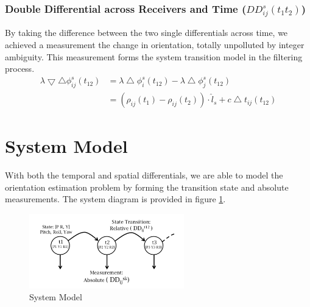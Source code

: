 \documentclass[journal,onecolumn]{IEEEtran}
\begin{document}
\subsubsection{Double Differential across Receivers and Time ($DD_{ij}^s(t_1t_2)$)}
By taking the difference between the two single differentials across time,
we achieved a measurement the change in orientation, totally unpolluted by integer ambiguity.
This measurement forms the system transition model in the filtering process.
\begin{equation}
  \begin{split}
  \lambda \bigtriangledown \bigtriangleup \phi_{ij}^{s}(t_{12})
  &= \lambda \bigtriangleup \phi_{i}^s(t_{12}) - \lambda \bigtriangleup \phi_{j}^s(t_{12})\\
  &= (\rho_{ij}(t_1)-\rho_{ij}(t_2)) \cdot \hat{l}_s + c\bigtriangleup t_{ij}(t_{12})
  \end{split}
\end{equation}

\section{System Model}
With both the temporal and spatial differentials, we are able to model the orientation
estimation problem by forming the transition state and absolute measurements.
The system diagram is provided in figure \ref{model}.\\
\begin{figure}
  \centering
  \captionsetup{justification=centering}
  \includegraphics[width=0.6\textwidth]{fig/model.png}
  \caption{System Model}
  \label{model}
\end{figure}
\end{document}
